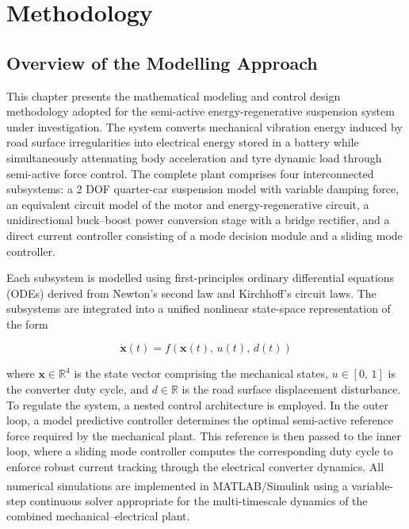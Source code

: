 \chapter{Methodology}
\label{ch:methodology}

\section{Overview of the Modelling Approach}
\label{sec:overview}

This chapter presents the mathematical modeling and control design
methodology adopted for the semi-active energy-regenerative suspension
system under investigation. The system converts mechanical vibration
energy induced by road surface irregularities into electrical energy
stored in a battery while simultaneously attenuating body acceleration and tyre dynamic load
through semi-active force control. The complete plant comprises four
interconnected subsystems: a 2 DOF quarter-car suspension model with variable damping force, an equivalent circuit model of the motor and energy-regenerative
circuit, a unidirectional buck--boost power conversion stage with a
bridge rectifier, and a direct current controller consisting of a mode
decision module and a sliding mode controller.

Each subsystem is modelled using first-principles ordinary differential
equations (ODEs) derived from Newton's second law and Kirchhoff's
circuit laws. The subsystems are integrated into a unified nonlinear
state-space representation of the form

\begin{equation}
    \dot{\bm{x}}(t) = f\!\left(\bm{x}(t),\, u(t),\, d(t)\right)
    \label{eq:nonlinear_ss}
\end{equation}

where $\bm{x} \in \mathbb{R}^{4}$ is the state vector comprising the
mechanical states, $u \in [0,\,1]$ is the converter duty
cycle, and $d \in \mathbb{R}$ is the road surface displacement
disturbance. To regulate the system, a nested control architecture is
employed. In the outer loop, a model predictive controller determines the
optimal semi-active reference force required by the mechanical plant. This reference is then passed to the inner loop, where a sliding mode controller
computes the corresponding duty cycle to enforce robust current tracking
through the electrical converter dynamics. All numerical simulations are implemented in
MATLAB\textsuperscript{\textregistered}/Simulink using a
variable-step continuous solver appropriate for the multi-timescale
dynamics of the combined mechanical--electrical plant.




